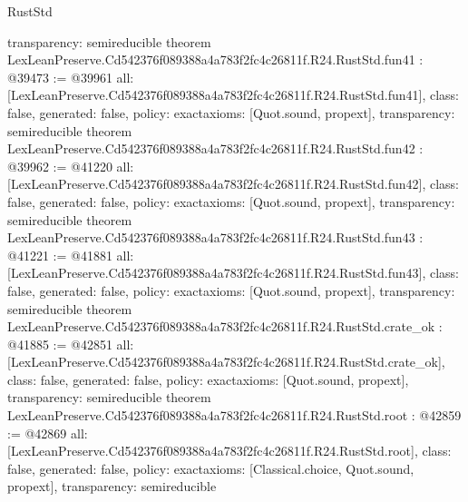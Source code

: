 \begin{lexlean}{RustStd}
\begin{coremodule}
{  transparency: semireducible
}
theorem LexLeanPreserve.Cd542376f089388a4a783f2fc4c26811f.R24.RustStd.fun41 : @39473 := @39961 {
  all: [LexLeanPreserve.Cd542376f089388a4a783f2fc4c26811f.R24.RustStd.fun41],
  class: false,
  generated: false,
  policy: exact{axioms: [Quot.sound, propext]},
  transparency: semireducible
}
theorem LexLeanPreserve.Cd542376f089388a4a783f2fc4c26811f.R24.RustStd.fun42 : @39962 := @41220 {
  all: [LexLeanPreserve.Cd542376f089388a4a783f2fc4c26811f.R24.RustStd.fun42],
  class: false,
  generated: false,
  policy: exact{axioms: [Quot.sound, propext]},
  transparency: semireducible
}
theorem LexLeanPreserve.Cd542376f089388a4a783f2fc4c26811f.R24.RustStd.fun43 : @41221 := @41881 {
  all: [LexLeanPreserve.Cd542376f089388a4a783f2fc4c26811f.R24.RustStd.fun43],
  class: false,
  generated: false,
  policy: exact{axioms: [Quot.sound, propext]},
  transparency: semireducible
}
theorem LexLeanPreserve.Cd542376f089388a4a783f2fc4c26811f.R24.RustStd.crate_ok : @41885 := @42851 {
  all: [LexLeanPreserve.Cd542376f089388a4a783f2fc4c26811f.R24.RustStd.crate_ok],
  class: false,
  generated: false,
  policy: exact{axioms: [Quot.sound, propext]},
  transparency: semireducible
}
theorem LexLeanPreserve.Cd542376f089388a4a783f2fc4c26811f.R24.RustStd.root : @42859 := @42869 {
  all: [LexLeanPreserve.Cd542376f089388a4a783f2fc4c26811f.R24.RustStd.root],
  class: false,
  generated: false,
  policy: exact{axioms: [Classical.choice, Quot.sound, propext]},
  transparency: semireducible
}


\end{coremodule}
\end{lexlean}
